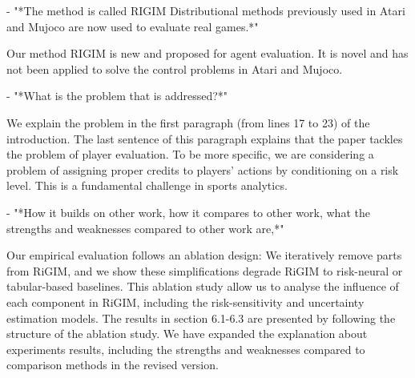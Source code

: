 \documentclass{article}
\begin{document}
- "*The method is called RIGIM Distributional methods previously used in Atari and Mujoco are now used to evaluate real games.*"

Our method RIGIM is new and proposed for agent evaluation. It is novel and has not been applied to solve the control problems in Atari and Mujoco.

- "*What is the problem that is addressed?*"

We explain the problem in the first paragraph (from lines 17 to 23) of the introduction. The last sentence of this paragraph explains that the paper tackles the problem of player evaluation. To be more specific, we are considering a problem of assigning proper credits to players' actions by conditioning on a risk level. This is a fundamental challenge in sports analytics.



- "*How it builds on other work, how it compares to other work, what the strengths and weaknesses compared to other work are,*"

Our empirical evaluation follows an ablation design: We iteratively remove parts from RiGIM, and we show these simplifications degrade RiGIM to risk-neural or tabular-based baselines. This ablation study allow us to analyse the influence of each component in RiGIM, including the risk-sensitivity and uncertainty estimation models. The results in section 6.1-6.3 are presented by following the structure of the ablation study. We have expanded the explanation about experiments results, including the strengths and weaknesses compared to comparison methods in the revised version.

\end{document}
